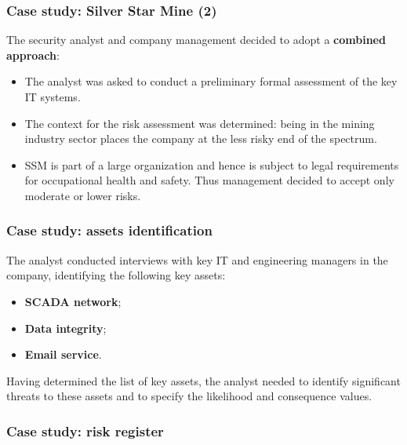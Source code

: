 \documentclass[xcolor ={table,usenames,dvipsnames}]{beamer}
\theoremstyle{definition}
\begin{document}
	\begin{frame}
		\frametitle{Case study: Silver Star Mine (2)}
		The security analyst and company management decided to adopt a \textbf{combined approach}:
		\begin{itemize}
			\item The analyst was asked to conduct a preliminary formal assessment of the key IT systems.
			\item The context for the risk assessment was determined: being in the mining industry sector places the company at the less risky end of the ­spectrum.
			\item SSM is part of a large organization and hence is subject to legal requirements for occupational health and safety. Thus management decided to accept only moderate or lower risks.
		\end{itemize}
	\end{frame}

	\begin{frame}
		\frametitle{Case study: assets identification}
		The analyst conducted interviews with key IT and engineering managers in the company, identifying the following key assets:
		\begin{itemize}
			\item \textbf{SCADA network};
			\item \textbf{Data integrity};
			\item \textbf{Email service}.
		\end{itemize}
		Having determined the list of key assets, the analyst needed to identify significant threats to these assets and to specify the likelihood and consequence values.
	\end{frame}
	
	\begin{frame}
		\frametitle{Case study: risk register}
	\end{frame}
\end{document}
